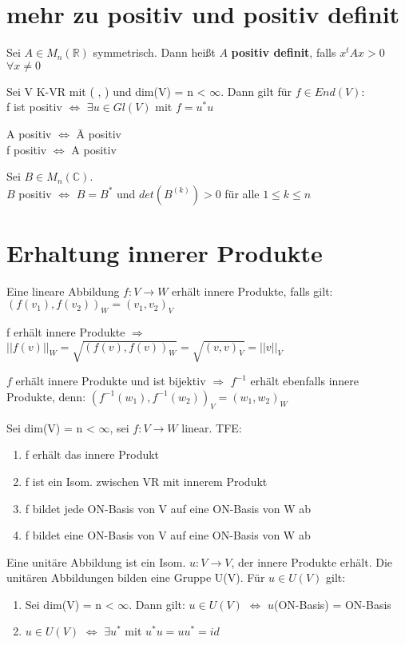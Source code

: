 \section{mehr zu positiv und positiv definit}
\begin{compactitem}
\item Sei $A \in M_n(\mathbb{R})$ symmetrisch. Dann heißt $A$ \textbf{positiv definit}, falls $x^tAx > 0$ $\forall x \neq 0$
\item Sei V K-VR mit ( , ) und dim(V) = n < $\infty$. Dann gilt für $f \in End(V)$:\\
f ist positiv $\Leftrightarrow$ $\exists u \in Gl(V)$ mit $f = u^*u$
\item A positiv $\Leftrightarrow$ \={A} positiv\\
f positiv $\Leftrightarrow$ A positiv
\item Sei $B \in M_n(\mathbb{C})$.\\
$B$ positiv $\Leftrightarrow$ $B = B^*$ und $det(B^{(k)}) > 0$ für alle $1 \le k \le n$
\end{compactitem}

\section{Erhaltung innerer Produkte}
\begin{compactitem}
\item Eine lineare Abbildung $f: V \to W$ erhält innere Produkte, falls gilt: $(f(v_1), f(v_2))_W = (v_1, v_2)_V$
\item f erhält innere Produkte $\Rightarrow$ $||f(v)||_W = \sqrt{(f(v), f(v))_W} = \sqrt{(v,v)_V} = ||v||_V$
\item $f$ erhält innere Produkte und ist bijektiv $\Rightarrow$ $f^{-1}$ erhält ebenfalls innere Produkte, denn: $(f^{-1}(w_1), f^{-1}(w_2))_V = (w_1, w_2)_W$
\item Sei dim(V) = n < $\infty$, sei $f: V \to W$ linear. TFE:
\begin{enumerate}
\item f erhält das innere Produkt
\item f ist ein Isom. zwischen VR mit innerem Produkt
\item f bildet jede ON-Basis von V auf eine ON-Basis von W ab
\item f bildet eine ON-Basis von V auf eine ON-Basis von W ab
\end{enumerate}
Eine unitäre Abbildung ist ein Isom. $u: V \to V$, der innere Produkte erhält.
Die unitären Abbildungen bilden eine Gruppe U(V). Für $u \in U(V)$ gilt:
\begin{enumerate}
\item Sei dim(V) = n < $\infty$. Dann gilt: $u \in U(V)$ $\Leftrightarrow$ $u$(ON-Basis) = ON-Basis
\item $u \in U(V)$ $\Leftrightarrow$ $\exists u^*$ mit $u^*u=uu^*=id$
\end{enumerate}
\end{compactitem}

